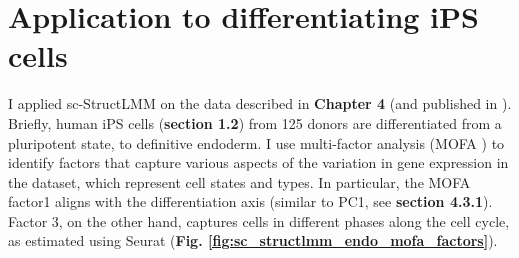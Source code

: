 




\section{Application to differentiating iPS cells}

I applied sc-StructLMM on the data described in \textbf{Chapter 
4} (and published in \cite{cuomo2020single}).
Briefly, human iPS cells (\textbf{section 
1.2}) from 125 donors are differentiated from a pluripotent state, to definitive endoderm. 
I use 
multi-factor analysis (MOFA \cite{argelaguet2018multi}) to identify factors that
capture various aspects of the variation in gene expression in the dataset, which represent cell states and types. 
In particular, the MOFA factor1 aligns with the differentiation axis (similar to PC1, see \textbf{section 
4.3.1}). 
Factor 3, on the other hand, captures cells in different phases along the cell cycle, as estimated using Seurat \cite{stuart2019comprehensive} (\textbf{Fig. \ref{fig:sc_structlmm_endo_mofa_factors}}). 
\\

